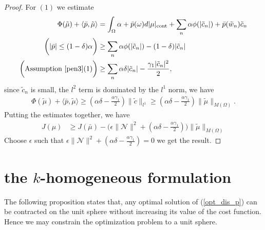 \documentclass[12pt,fleqn]{amsart}
\theoremstyle{definition}
\DeclareMathOperator*{\cont}{cont}
\begin{document}
\begin{proof}
For $(1)$ we estimate
\begin{align*}
	\Phi(\tilde{\mu}) + \langle \bar{p}, \tilde{\mu} \rangle &= \int_\Omega \alpha + \bar{p}(\omega) d|\mu|_{\cont} + \sum_{n} \alpha \phi(|\tilde{c}_n|) + \bar{p}(\tilde{w}_n) \tilde{c}_n \\
	\bigg(|\bar{p}| \le (1 - \delta) \alpha \bigg)
	&\ge  \sum_n \alpha \phi(|\tilde{c}_n|) - (1 - \delta)|\tilde{c}_n| \\
	\bigg(\text{Assumption } \ref{pen3} (1)\bigg)
	&\ge \sum_n \alpha \delta |\tilde{c}_n| -  \frac{\gamma_1 |\tilde{c}_n|^2}{2},
\end{align*}
since $\tilde{c}_n$ is small, the $l^2$ term is dominated by the $l^1$ norm, we have 
\begin{align*}
	\Phi(\tilde{\mu}) + \langle \bar{p}, \tilde{\mu}\rangle \ge (\alpha \delta - \frac{\alpha\gamma_1}{2}) \|\tilde{c}\|_{l^1} \ge (\alpha \delta - \frac{\alpha\gamma_1}{2}) \|\tilde{\mu}\|_{M(\Omega)} .
\end{align*}
Putting the estimates together, we have
\begin{align*}
	J(\mu) &\ge J(\bar{\mu}) - \bigg(\epsilon \|\mathcal{N}\|^2 + (\alpha \delta - \frac{\alpha\gamma_1}{2}) \bigg) \|\tilde{\mu}\|_{M(\Omega)}
\end{align*} 
Choose $\epsilon$ such that  $\epsilon \|\mathcal{N}\|^2 + (\alpha \delta - \frac{\alpha\gamma_1}{2}) = 0$ we get the result. 
\end{proof}



\section{the \texorpdfstring{$k$}{k}-homogeneous formulation}

The following proposition states that, any optimal solution of (\ref{opt_dis_p}) can be contracted on the unit sphere without increasing its value of the cost function. 
Hence we may constrain the optimization problem to a unit sphere. 
\end{document}
